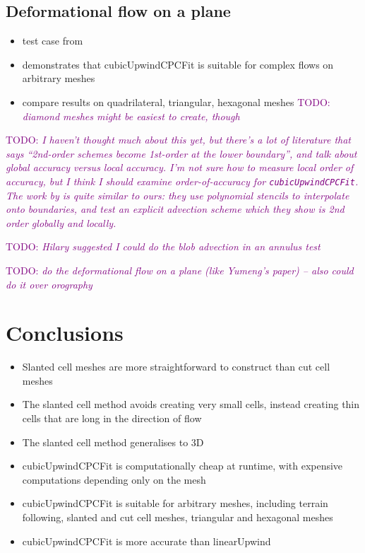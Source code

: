 \documentclass{article}
\newcommand{\TODO}[1]{\textcolor{purple}{TODO: \emph{#1}}}
\begin{document}
\subsection{Deformational flow on a plane}
\begin{itemize}
	\item test case from \citet{lauritzen2012}
	\item demonstrates that cubicUpwindCPCFit is suitable for complex flows on arbitrary meshes
	\item compare results on quadrilateral, triangular, hexagonal meshes \TODO{diamond meshes might be easiest to create, though}
\end{itemize}

\TODO{I haven't thought much about this yet, but there's a lot of literature that says ``2nd-order schemes become 1st-order at the lower boundary'', and talk about global accuracy versus local accuracy.  I'm not sure how to measure local order of accuracy, but I think I should examine order-of-accuracy for \texttt{cubicUpwindCPCFit}.  The work by \citet{ye1999} is quite similar to ours: they use polynomial stencils to interpolate onto boundaries, and test an explicit advection scheme which they show is 2nd order globally and locally.}

\TODO{Hilary suggested I could do the blob advection in an annulus test \citep{berger-helzel2012}}

\TODO{do the deformational flow on a plane (like Yumeng's paper) -- also could do it over orography}


\section{Conclusions}

\begin{itemize}
	\item Slanted cell meshes are more straightforward to construct than cut cell meshes
	\item The slanted cell method avoids creating very small cells, instead creating thin cells that are long in the direction of flow
	\item The slanted cell method generalises to 3D
	\item cubicUpwindCPCFit is computationally cheap at runtime, with expensive computations depending only on the mesh
	\item cubicUpwindCPCFit is suitable for arbitrary meshes, including terrain following, slanted and cut cell meshes, triangular and hexagonal meshes
	\item cubicUpwindCPCFit is more accurate than linearUpwind
\end{itemize}
\end{document}
